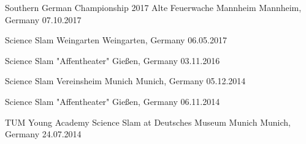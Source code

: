 \begin{cvhonors}
\cvhonor
{Southern German Championship 2017 Alte Feuerwache Mannheim} %
{Mannheim, Germany} %
{} %
{07.10.2017} %

\cvhonor
{Science Slam Weingarten} %
{Weingarten, Germany} %
{} %
{06.05.2017} %

\cvhonor
{Science Slam "Affentheater"} %
{Gießen, Germany} %
{} %
{03.11.2016} %

\cvhonor
{Science Slam Vereinsheim Munich} %
{Munich, Germany} %
{} %
{05.12.2014} %

\cvhonor
{Science Slam "Affentheater"} %
{Gießen, Germany} %
{} %
{06.11.2014} %

\cvhonor
{TUM Young Academy Science Slam at Deutsches Museum Munich} %
{Munich, Germany} %
{} %
{24.07.2014} %

\end{cvhonors}


